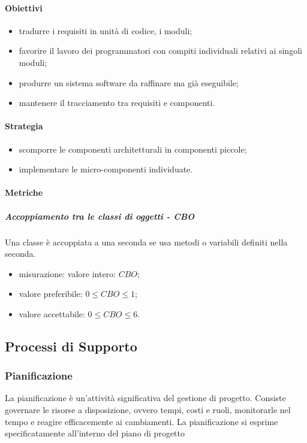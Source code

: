 		\paragraph{Obiettivi}
		\begin{itemize}
			\item tradurre i requisiti in unità di codice, i moduli;
			\item favorire il lavoro dei programmatori con compiti individuali relativi ai singoli moduli;
			\item produrre un sistema software da raffinare ma già eseguibile;
			\item mantenere il tracciamento tra requisiti e componenti.
		\end{itemize}
		\paragraph{Strategia}
		\begin{itemize}
			\item scomporre le componenti architetturali in componenti piccole;
			\item implementare le micro-componenti individuate.
		\end{itemize}
		\paragraph{Metriche}
			\subparagraph{Accoppiamento tra le classi di oggetti - CBO} 
			Una classe è accoppiata a una seconda se usa metodi o variabili definiti nella seconda. 
			\begin{itemize}
				\item misurazione: valore intero: $CBO$;
				\item valore preferibile: $0 \leq CBO \leq 1$;
				\item valore accettabile: $0 \leq CBO \leq 6$.
			\end{itemize}
		
\subsection{Processi di Supporto}
	\subsubsection{Pianificazione}
	La pianificazione è un'attività significativa del gestione di progetto. Consiste governare le risorse a disposizione, ovvero tempi, costi e ruoli, monitorarle nel tempo e reagire efficacemente ai cambiamenti. La pianificazione si esprime specificatamente all'interno del piano di progetto
